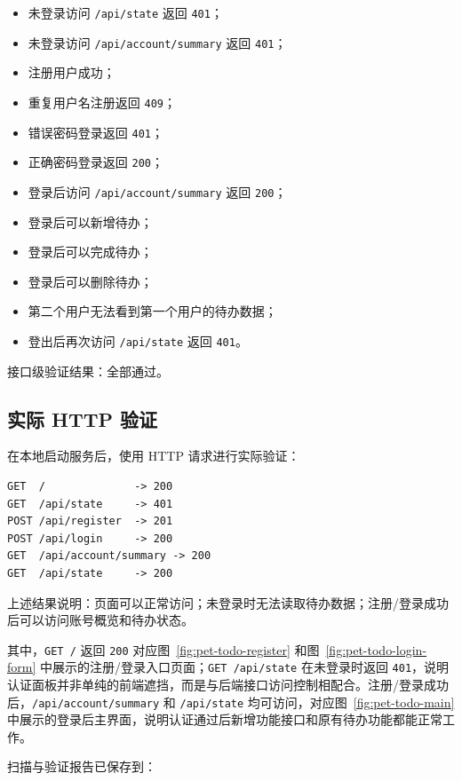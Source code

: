 \documentclass[12pt,a4paper]{ctexart}
\begin{document}
\begin{itemize}[leftmargin=2.5em]
    \item 未登录访问 \texttt{/api/state} 返回 \texttt{401}；
    \item 未登录访问 \texttt{/api/account/summary} 返回 \texttt{401}；
    \item 注册用户成功；
    \item 重复用户名注册返回 \texttt{409}；
    \item 错误密码登录返回 \texttt{401}；
    \item 正确密码登录返回 \texttt{200}；
    \item 登录后访问 \texttt{/api/account/summary} 返回 \texttt{200}；
    \item 登录后可以新增待办；
    \item 登录后可以完成待办；
    \item 登录后可以删除待办；
    \item 第二个用户无法看到第一个用户的待办数据；
    \item 登出后再次访问 \texttt{/api/state} 返回 \texttt{401}。
\end{itemize}

接口级验证结果：全部通过。

\subsection{实际 HTTP 验证}

在本地启动服务后，使用 HTTP 请求进行实际验证：

\begin{verbatim}
GET  /              -> 200
GET  /api/state     -> 401
POST /api/register  -> 201
POST /api/login     -> 200
GET  /api/account/summary -> 200
GET  /api/state     -> 200
\end{verbatim}

上述结果说明：页面可以正常访问；未登录时无法读取待办数据；注册/登录成功后可以访问账号概览和待办状态。

其中，\texttt{GET /} 返回 \texttt{200} 对应图~\ref{fig:pet-todo-register} 和图~\ref{fig:pet-todo-login-form} 中展示的注册/登录入口页面；\texttt{GET /api/state} 在未登录时返回 \texttt{401}，说明认证面板并非单纯的前端遮挡，而是与后端接口访问控制相配合。注册/登录成功后，\texttt{/api/account/summary} 和 \texttt{/api/state} 均可访问，对应图~\ref{fig:pet-todo-main} 中展示的登录后主界面，说明认证通过后新增功能接口和原有待办功能都能正常工作。

扫描与验证报告已保存到：
\end{document}
